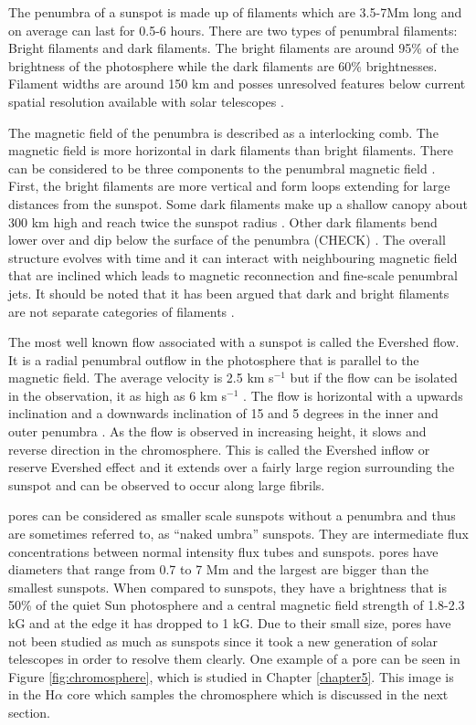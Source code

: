 	The penumbra of a sunspot is made up of filaments which are 3.5-7Mm long and on average can last for 0.5-6 hours.
	There are two types of penumbral filaments: Bright filaments and dark filaments.
	The bright filaments are around 95\% of the brightness of the photosphere while the dark filaments are 60\% brightnesses.
	Filament widths are around 150 km and posses unresolved features below current spatial resolution available with solar telescopes \citep{2002Natur.420..151S,2011Sci...333..316S}.
	
	The magnetic field of the penumbra is described as a interlocking comb.
	The magnetic field is more horizontal in dark filaments than bright filaments.
	There can be considered to be three components to the penumbral magnetic field \citep{2005A&A...436.1087L}.
	First, the bright filaments are more vertical and form loops extending for large distances from the sunspot.
	Some dark filaments make up a shallow canopy about 300 km high and reach twice the sunspot radius \cite{1991A&A...252..821D}.
	Other dark filaments bend lower over and dip below the surface of the penumbra (CHECK) \citep{1993ApJ...403..780T}.
	The overall structure evolves with time and it can interact with neighbouring magnetic field that are inclined which leads to magnetic reconnection and fine-scale penumbral jets.
	It should be noted that it has been argued that dark and bright filaments are not separate categories of filaments \citep{2013A&A...557A..25T}.
	
	The most well known flow associated with a sunspot is called the Evershed flow.
	It is a radial penumbral outflow in the photosphere that is parallel to the magnetic field.
	The average velocity is 2.5 km s$^{-1}$ but if the flow can be isolated in the observation, it as high as 6 km s$^{-1}$ \citep{2003A&A...403L..47B}.
	The flow is horizontal with a upwards inclination and a downwards inclination of 15 and 5 degrees in the inner and outer penumbra \citep{2004A&A...415..717T}.
	As the flow is observed in increasing height, it slows and reverse direction in the chromosphere.
	This is called the Evershed inflow or reserve Evershed effect and it extends over a fairly large region surrounding the sunspot and can be observed to occur along large fibrils.
	
    pores can be considered as smaller scale sunspots without a penumbra and thus are sometimes referred to, as ``naked umbra'' sunspots.
    They are intermediate flux concentrations between normal intensity flux tubes and sunspots.
	pores have diameters that range from 0.7 to 7 Mm and the largest are bigger than the smallest sunspots.
	When compared to sunspots, they have a brightness that is 50\% of the quiet Sun photosphere and a central magnetic field strength of 1.8-2.3 kG and at the edge it has dropped to 1 kG.
    Due to their small size, pores have not been studied as much as sunspots since it took a new generation of solar telescopes in order to resolve them clearly.
    One example of a pore can be seen in Figure \ref{fig:chromosphere}, which is studied in Chapter \ref{chapter5}.
    This image is in the H$\alpha$ core which samples the chromosphere which is discussed in the next section.

